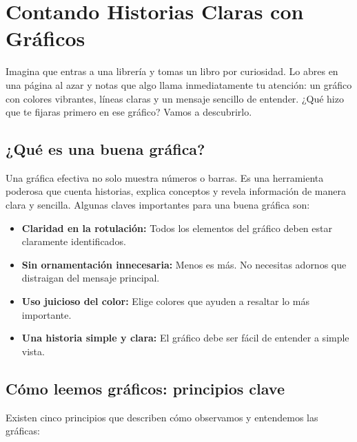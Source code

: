 \documentclass[
  spanish,
  letterpaper,
  DIV=11,
  numbers=noendperiod]{scrreprt}
\providecommand{\tightlist}{%
  \setlength{\itemsep}{0pt}\setlength{\parskip}{0pt}}
\begin{document}

\chapter{Contando Historias Claras con
Gráficos}\label{contando-historias-claras-con-gruxe1ficos}

Imagina que entras a una librería y tomas un libro por curiosidad. Lo
abres en una página al azar y notas que algo llama inmediatamente tu
atención: un gráfico con colores vibrantes, líneas claras y un mensaje
sencillo de entender. ¿Qué hizo que te fijaras primero en ese gráfico?
Vamos a descubrirlo.

\section{¿Qué es una buena
gráfica?}\label{quuxe9-es-una-buena-gruxe1fica}

Una gráfica efectiva no solo muestra números o barras. Es una
herramienta poderosa que cuenta historias, explica conceptos y revela
información de manera clara y sencilla. Algunas claves importantes para
una buena gráfica son:

\begin{itemize}
\tightlist
\item
  \textbf{Claridad en la rotulación:} Todos los elementos del gráfico
  deben estar claramente identificados.
\item
  \textbf{Sin ornamentación innecesaria:} Menos es más. No necesitas
  adornos que distraigan del mensaje principal.
\item
  \textbf{Uso juicioso del color:} Elige colores que ayuden a resaltar
  lo más importante.
\item
  \textbf{Una historia simple y clara:} El gráfico debe ser fácil de
  entender a simple vista.
\end{itemize}

\section{Cómo leemos gráficos: principios
clave}\label{cuxf3mo-leemos-gruxe1ficos-principios-clave}

Existen cinco principios que describen cómo observamos y entendemos las
gráficas:
\end{document}
